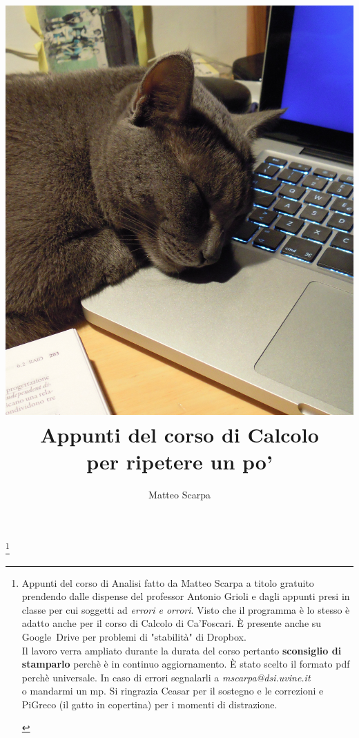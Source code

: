 \documentclass[a4paper,11pt]{report}}}
\title {
\includegraphics[scale=1]{Copertina}\\
Appunti del corso di Calcolo\\ {\large per ripetere un po'}}
\author{Matteo Scarpa}
\begin{document}
\maketitle

\thanks{
 \begin{center}
Appunti del corso di
 Analisi fatto da Matteo Scarpa a titolo gratuito prendendo dalle dispense del professor Antonio Grioli e dagli appunti presi in classe per cui soggetti ad \textit{errori e orrori}. Visto che il programma è lo stesso è adatto anche per il corso di Calcolo di Ca'Foscari.
  È presente anche su Google~Drive per problemi di "stabilità" di Dropbox.\\
  Il lavoro verra ampliato durante la durata del corso pertanto \textbf{sconsiglio di stamparlo} perchè è in continuo aggiornamento.
  È stato scelto il formato pdf perchè universale. In caso di errori segnalarli a \textit{mscarpa@dsi.uvine.it}\\ o mandarmi un mp.
 Si ringrazia Ceasar per il sostegno e le correzioni e PiGreco (il gatto in copertina) per i momenti di distrazione.
\end{center}
}

 \tableofcontents
 \newpage












\end{document}
